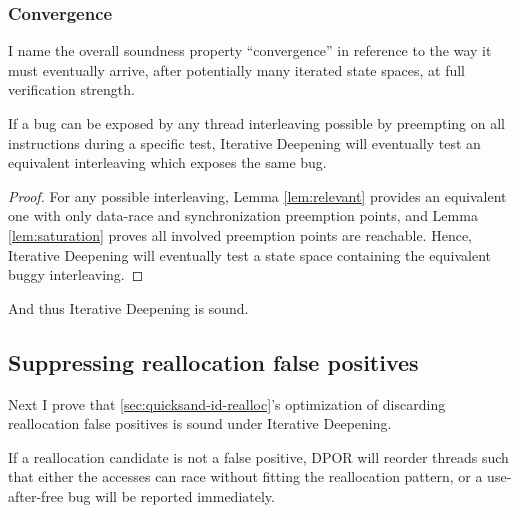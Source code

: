 \subsubsection{Convergence}

I name the overall soundness property ``convergence''
in reference to the way it must eventually arrive,
after potentially many iterated state spaces,
at full verification strength.

\begin{theorem}[Convergence]
	If a bug can be exposed by any thread interleaving possible
	by preempting on all instructions during a specific test,
	Iterative Deepening will eventually test an equivalent interleaving which exposes the same bug.
        \label{thm:convergence}
\end{theorem}

\begin{proof}
	For any possible interleaving,
	Lemma \ref{lem:relevant} provides an equivalent one with only data-race and synchronization preemption points,
	and Lemma \ref{lem:saturation} proves all involved preemption points are reachable.
	Hence, Iterative Deepening will eventually test a state space containing the equivalent buggy interleaving.
\end{proof}

And thus Iterative Deepening is sound. %

\subsection{Suppressing reallocation false positives}
\label{sec:quicksand-realloc}

Next I prove that \cref{sec:quicksand-id-realloc}'s optimization
of discarding reallocation false positives is sound under Iterative Deepening.

\begin{theorem}
        If a reallocation candidate is not a false positive,
DPOR will reorder threads such that
either
the accesses can race without fitting the reallocation pattern,
or a use-after-free bug will be reported immediately.
\end{theorem}

